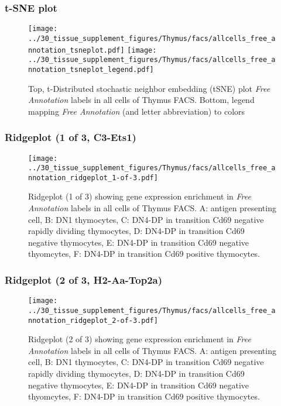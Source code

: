\clearpage
\subsubsection{t-SNE plot}
\begin{figure}[h]
\centering
\texttt{[image: ../30\_tissue\_supplement\_figures/Thymus/facs/allcells\_free\_annotation\_tsneplot.pdf]}
\texttt{[image: ../30\_tissue\_supplement\_figures/Thymus/facs/allcells\_free\_annotation\_tsneplot\_legend.pdf]}
\caption{Top, t-Distributed stochastic neighbor embedding (tSNE) plot  \emph{Free Annotation} labels in all cells of Thymus FACS. Bottom, legend mapping \emph{Free Annotation} (and letter abbreviation) to colors}
\end{figure}


\clearpage

\subsubsection{Ridgeplot (1 of 3, C3-Ets1)}
\begin{figure}[h]
\centering
\texttt{[image: ../30\_tissue\_supplement\_figures/Thymus/facs/allcells\_free\_annotation\_ridgeplot\_1-of-3.pdf]}

\caption{ Ridgeplot (1 of 3)  showing gene expression enrichment in \emph{Free Annotation} labels in all cells of Thymus FACS. A: antigen presenting cell, B: DN1 thymocytes, C: DN4-DP in transition Cd69 negative rapidly dividing thymocytes, D: DN4-DP in transition Cd69 negative thymocytes, E: DN4-DP in transition Cd69 negative thyomcytes, F: DN4-DP in transition Cd69 positive thymocytes.}
\end{figure}


\clearpage

\subsubsection{Ridgeplot (2 of 3, H2-Aa-Top2a)}
\begin{figure}[h]
\centering
\texttt{[image: ../30\_tissue\_supplement\_figures/Thymus/facs/allcells\_free\_annotation\_ridgeplot\_2-of-3.pdf]}

\caption{ Ridgeplot (2 of 3)  showing gene expression enrichment in \emph{Free Annotation} labels in all cells of Thymus FACS. A: antigen presenting cell, B: DN1 thymocytes, C: DN4-DP in transition Cd69 negative rapidly dividing thymocytes, D: DN4-DP in transition Cd69 negative thymocytes, E: DN4-DP in transition Cd69 negative thyomcytes, F: DN4-DP in transition Cd69 positive thymocytes.}
\end{figure}


